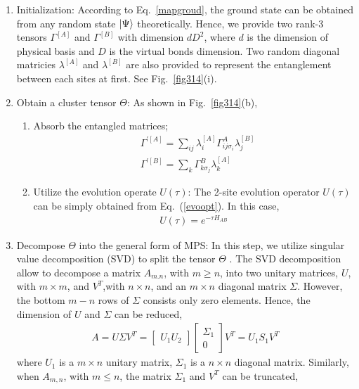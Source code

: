 \begin{enumerate}
	\item Initialization: According to Eq.~{\ref{mapgroud}}, the ground state can be obtained from any random state $\Ket{\Psi}$ theoretically. Hence, we provide two rank-3 tensors $\Gamma^{[A]}$ and $\Gamma^{[B]}$ with dimension $dD^2$, where $d$ is the dimension of physical basis and $D$ is the virtual bonds dimension. Two random diagonal matricies $\lambda^{[A]}$ and $\lambda^{[B]}$ are also provided to represent the entanglement between each sites at first. See Fig.~\ref{fig314}(i).
	\item Obtain a cluster tensor $\Theta$: As shown in Fig.~\ref{fig314}(b),
		\begin{enumerate}
			\item Absorb the entangled matrices; 
				\begin{align}
					&\Gamma^{\prime [A]} = \sum_{ij}{\lambda^{[A]}_{i} \Gamma^{A}_{ij \sigma_i} \lambda^{[B]}_{j}} \\
					&\Gamma^{\prime [B]} = \sum_{k}{\Gamma^{B}_{k \sigma_j} \lambda^{[A]}_{k}}
				\end{align}
			\item Utilize the evolution operate $U(\tau)$: The 2-site evolution operator $U(\tau)$ can be simply obtained from Eq.~(\ref{evoopt}). In this case, 
				\begin{align}
					U(\tau) = e^{-\tau H_{AB}}
				\end{align}
		\end{enumerate}
	\item Decompose $\Theta$ into the general form of MPS: In this step, we utilize singular value decomposition (SVD) to split the tensor $\Theta$ . The SVD decomposition allow to decompose a matrix $A_{m.n}$, with $m \geq n$, into two unitary matrices, $U$, with $m \times m$, and $V^{T}$,with $n \times n$, and an $m \times n$ diagonal matrix $\Sigma$. However, the bottom $m - n$ rows of $\Sigma$ consists only zero elements. Hence, the dimension of $U$ and $\Sigma$ can be reduced,
		\begin{align}
			A = U \Sigma V^T = \begin{bmatrix} U_1 U_2 \end{bmatrix} \begin{bmatrix} \Sigma_1 \\ 0 \end{bmatrix} V^T = U_1 S_1 V^T
		\end{align}
		where $U_1$ is a $m \times n$ unitary matrix, $\Sigma_1$ is a $n \times n$ diagonal matrix. Similarly, when $A_{m,n}$, with $m \leq n$, the matrix $\Sigma_1$ and $V^T$ can be truncated,

\end{enumerate}
